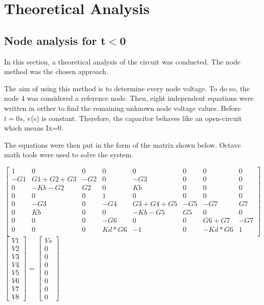 \section{Theoretical Analysis} \label{section:theo}


\subsection{Node analysis for t$<$0}

\par In this section, a theoretical analysis of the circuit was conducted. The node method was the chosen approach.

The aim of using this method is to determine every node voltage. To do so, the node 4 was considered a reference node. Then, eight independent equations were written in orther to find the remaining unknown node voltage values. Before $t=0s$, v(s) is constant. Therefore, the capacitor behaves like an open-circuit which means Ix=0.


The equations were then put in the form of the matrix shown below. Octave math tools were used to solve the system.



$\begin{bmatrix}
1 & 0 & 0 & 0 & 0 & 0 & 0 & 0\\
-G1 & G1+G2+G3 & -G2 & 0 & -G3 & 0 & 0 & 0\\
0 &-Kb-G2 & G2 & 0 & Kb & 0 & 0 & 0\\
0 & 0 & 0 & 1 & 0 & 0 & 0 & 0\\
0 & -G3 & 0 & -G4 & G3+G4+G5 & -G5 & -G7 & G7\\
0 & Kb & 0 & 0 & -Kb-G5 & G5 & 0 & 0\\
0 & 0 & 0 & -G6 & 0 & 0 & G6+G7 & -G7\\
0 & 0 & 0 & Kd*G6 & -1 & 0 & -Kd*G6 & 1\\
\end{bmatrix}
$$\begin{bmatrix}
V1 \\ V2 \\ V3 \\ V4 \\ V5 \\ V6 \\ V7 \\ V8
\end{bmatrix}$
=
$\begin{bmatrix}
Vs \\ 0 \\ 0 \\ 0 \\ 0 \\ 0 \\ 0 \\ 0
\end{bmatrix}
$

